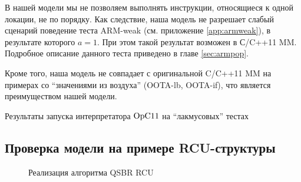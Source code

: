 В нашей модели мы не позволяем выполнять инструкции, относящиеся к одной локации, не по порядку.
Как следствие, наша модель не разрешает слабый сценарий поведение теста \textrm{ARM-weak}
(см. приложение \ref{app:armweak}), в результате которого $a = 1$.
При этом такой результат возможен в С/C++11 MM.
Подробное описание данного теста приведено в главе \ref{sec:armpop}.

Кроме того, наша модель не совпадает с оригинальной C/C++11 MM на примерах со ``значениями из воздуха''
(\textrm{OOTA-lb}, \textrm{OOTA-if}), что является преимуществом нашей модели.


\begin{table}
\centering
{%
 \small
 
}
\caption{Результаты запуска интерпретатора $\mathrm{OpC11}$ на ``лакмусовых'' тестах}
\label{fig:litmusTbl}
\end{table}


\subsection{Проверка модели на примере RCU-структуры}
\label{sec:opc11:rcu}

\begin{figure*}

\caption[Реализация алгоритма QSBR RCU]
{Реализация алгоритма QSBR RCU}
\label{fig:rcuProg} \end{figure*}

